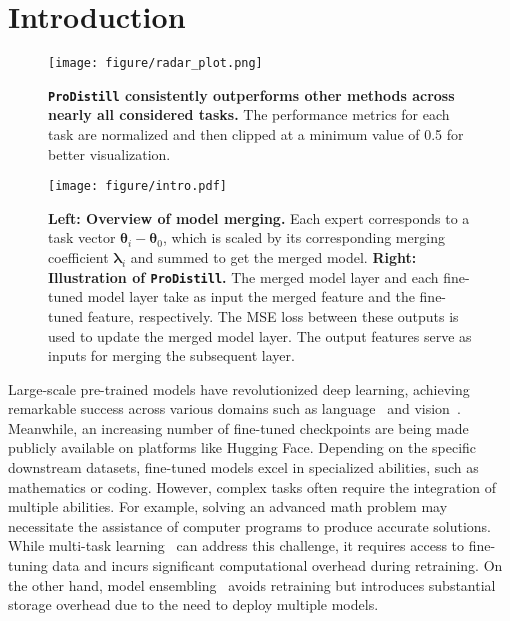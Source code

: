 
\section{Introduction}
\label{sec:intro}

\begin{figure}
    \centering
    \texttt{[image: figure/radar\_plot.png]}
    \vspace{-10pt}
    \caption{\textbf{\texttt{ProDistill} consistently outperforms other methods across nearly all considered tasks.} The performance metrics for each task are normalized and then clipped at a minimum value of 0.5 for better visualization.}
    \vspace{-10pt}
    \label{fig:enter-label}
\end{figure}

\begin{figure*}
    \centering
    \texttt{[image: figure/intro.pdf]}
    \vspace{-10pt}
    \caption{\textbf{Left: Overview of model merging.} Each expert corresponds to a task vector $\boldsymbol{\theta}_i-\boldsymbol{\theta}_0$, which is scaled by its corresponding merging coefficient $\boldsymbol{\lambda}_i$ and summed to get the merged model. \textbf{Right: Illustration of \texttt{ProDistill}.} The merged model layer and each fine-tuned model layer take as input the merged feature and the fine-tuned feature, respectively. The MSE loss between these outputs is used to update the merged model layer. The output features serve as inputs for merging the subsequent layer. }
    \vspace{-5pt}
    \label{fig: overview}
\end{figure*}

Large-scale pre-trained models have revolutionized deep learning, achieving remarkable success across various domains such as language~\citep{brown2020language,team2023gemini, touvron2023llama} and vision~\citep{dosovitskiy2020image, ramesh2021zero}. 
Meanwhile, an increasing number of fine-tuned checkpoints are being made publicly available on platforms like Hugging Face. Depending on the specific downstream datasets, fine-tuned models excel in specialized abilities, such as mathematics or coding. However, complex tasks often require the integration of multiple abilities. For example, solving an advanced math problem may necessitate the assistance of computer programs to produce accurate solutions. While multi-task learning~\citep{caruana1997multitask,misra2016cross,sener2018multi,liu2019end} can address this challenge, it requires access to fine-tuning data and incurs significant computational overhead during retraining. On the other hand, model ensembling~\citep{dietterich2002ensemble,kurutach2018model,ganaie2022ensemble} avoids retraining but introduces substantial storage overhead due to the need to deploy multiple models.

